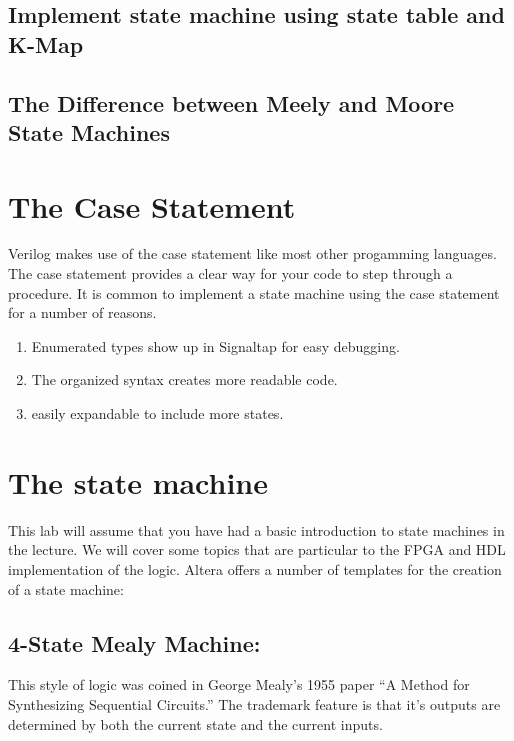   \subsection{Implement state machine using state table and K-Map}

  \subsection{The Difference between Meely and Moore State Machines}

  \section{The Case Statement}
    Verilog makes use of the case statement like most other progamming languages. The case statement provides a clear way for your code to step through a procedure. It is common to implement a state machine using the case statement for a number of reasons.
    \begin{enumerate}
      \item Enumerated types show up in Signaltap for easy debugging.
      \item The organized syntax creates more readable code.
      \item easily expandable to include more states.
    \end{enumerate}

  \section{The state machine}
    This lab will assume that you have had a basic introduction to state machines in the lecture. We will cover some topics that are particular to the FPGA and HDL implementation of the logic. Altera offers a number of templates for the creation of a state machine\cite{Altera:QuartusHandbook}:
      
      \subsection{4-State Mealy Machine:} This style of logic was coined in George Mealy's 1955 paper “A Method for Synthesizing Sequential Circuits.” The trademark feature is that it's outputs are determined by both the current state and the current inputs. \cite{Wikipedia:MealyMachine}
      
